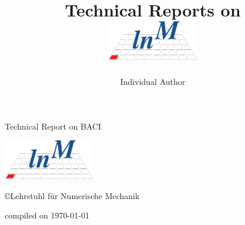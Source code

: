 \documentclass[a4paper,10pt]{report}
\title{Technical Reports on \baci{}\\
\vspace{2cm}
\includegraphics[width=0.3\textwidth]{templates/gfx/lnm-notext}
}
\author{Individual Author}
\newcommand{\baci}{\textsc{BACI}}
\begin{document}
\bibliographyunit[\chapter]
%


\begin{titlepage}
\vspace{5cm}
\begin{center}
\huge{Technical Report on \baci{}}

\vspace{2cm}

\includegraphics[width=0.3\textwidth]{templates/gfx/lnm-notext}

\vspace{2cm}

\copyright{}Lehrstuhl f\"{u}r Numerische Mechanik

\vspace{2cm}

\small{compiled on \today}

\end{center}
\end{titlepage}

\tableofcontents

\newpage
\end{document}
